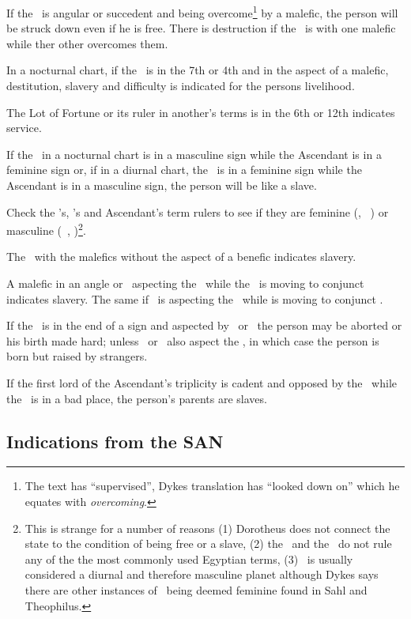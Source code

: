 If the \Moon\, is angular or succedent and being overcome\footnote{The text has ``supervised'', Dykes translation has ``looked down on'' which he equates with \textsl{overcoming}.} by a malefic, the person will be struck down even if he is free. There is destruction if the \Moon\, is with one malefic while ther other overcomes them.

In a nocturnal chart, if the \Moon\, is in the 7th or 4th and in the aspect of a malefic, destitution, slavery and difficulty is indicated for the persons livelihood.

The Lot of Fortune or its ruler in another's terms is in the 6th or 12th  indicates service.

If the \Moon\, in a nocturnal chart is in a masculine sign while the Ascendant is in a feminine sign or, if in a diurnal chart, the \Sun\, is in a feminine sign while the Ascendant is in a masculine sign, the person will be like a slave.

Check the \Moon's, \Sun's and Ascendant's term rulers to see if they are feminine (\Saturn, \Venus\, \Moon) or masculine (\Sun\, \Jupiter, \Mars)\footnote{This is strange for a number of reasons (1) Dorotheus does not connect the state to the condition of being free or a slave, (2) the \Moon\, and the \Sun\, do not rule any of the the most commonly used Egyptian terms, (3) \Saturn\, is usually considered a diurnal and therefore masculine planet although Dykes says there are other instances of \Saturn\, being deemed feminine found in Sahl and Theophilus.}.

The \Moon\, with the malefics without the aspect of a benefic indicates slavery.

A malefic in an angle or \Mars\, aspecting the \Moon\,  while the \Moon\, is moving to conjunct \Saturn\, indicates slavery. The same if \Saturn\, is aspecting the \Moon\, while is moving to conjunct \Mars.

If the \Moon\, is in the end of a sign and aspected by \Saturn\, or \Mars\, the person may be aborted or his birth made hard; unless \Jupiter\, or \Venus\, also aspect the \Moon, in which case the person is born but raised by strangers.

If the first lord of the Ascendant's triplicity is cadent and opposed by the \Moon\, while the \Sun\, is in a bad place, the person's parents are slaves.

\subsection{Indications from the SAN}

